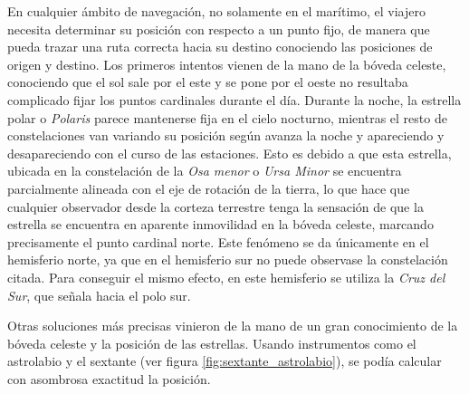 En cualquier ámbito de navegación, no solamente en el marítimo, el viajero necesita determinar su posición con respecto a un punto fijo, de manera que pueda trazar una ruta correcta hacia su destino conociendo las posiciones de origen y destino. Los primeros intentos vienen de la mano de la bóveda celeste, conociendo que el sol sale por el este y se pone por el oeste no resultaba complicado fijar los puntos cardinales durante el día. Durante la noche, la estrella polar o \textit{Polaris} parece mantenerse fija en el cielo nocturno, mientras el resto de constelaciones van variando su posición según avanza la noche y apareciendo y desapareciendo con el curso de las estaciones. Esto es debido a que esta estrella, ubicada en la constelación de la \textit{Osa menor} o \textit{Ursa Minor} se encuentra parcialmente alineada con el eje de rotación de la tierra, lo que hace que cualquier observador desde la corteza terrestre tenga la sensación de que la estrella se encuentra en aparente inmovilidad en la bóveda celeste, marcando precisamente el punto cardinal norte. Este fenómeno se da únicamente en el hemisferio norte, ya que en el hemisferio sur no puede observase la constelación citada. Para conseguir el mismo efecto, en este hemisferio se utiliza la \textit{Cruz del Sur}, que señala hacia el polo sur.

Otras soluciones más precisas vinieron de la mano de un gran conocimiento de la bóveda celeste y la posición de las estrellas. Usando instrumentos como el astrolabio y el sextante (ver figura \ref{fig:sextante_astrolabio}), se podía calcular con asombrosa exactitud la posición.


